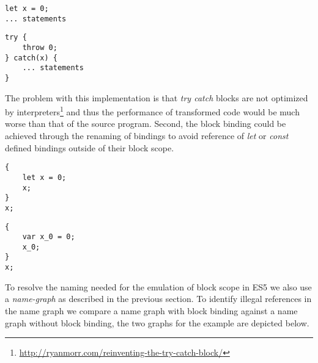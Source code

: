 \begin{minipage}{0.45\linewidth}
\begin{lstlisting}
let x = 0;
... statements
\end{lstlisting}
\end{minipage}
\hfill
\begin{minipage}{0.45\linewidth}
\begin{lstlisting}
try {
	throw 0;
} catch(x) {
	... statements
}
\end{lstlisting}
\end{minipage}

The problem with this implementation is that \textit{try catch} blocks are not optimized by interpreters\footnote{\url{http://ryanmorr.com/reinventing-the-try-catch-block/}} and thus the performance of transformed code would be much worse than that of the source program. Second, the block binding could be achieved through the renaming of bindings to avoid reference of \textit{let} or \textit{const} defined bindings outside of their block scope.

\begin{minipage}{0.45\linewidth}
\begin{lstlisting}
{
	let x = 0;
	x;
}
x;
\end{lstlisting}
\end{minipage}
\hfill
\begin{minipage}{0.45\linewidth}
\begin{lstlisting}
{
	var x_0 = 0;
	x_0;
}
x;
\end{lstlisting}
\end{minipage}

To resolve the naming needed for the emulation of block scope in ES5 we also use a \textit{name-graph} as described in the previous section. To identify illegal references in the name graph we compare a name graph with block binding against a name graph without block binding, the two graphs for the example are depicted below.

